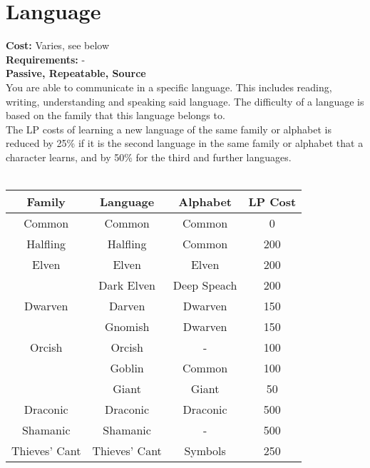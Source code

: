 \section{Language}\label{sec:language}
\textbf{Cost:} Varies, see below\\
\textbf{Requirements:} -\\
\textbf{Passive, Repeatable, Source}\\
You are able to communicate in a specific language.
This includes reading, writing, understanding and speaking said language.
The difficulty of a language is based on the family that this language belongs to.\\
The LP costs of learning a new language of the same family or alphabet is reduced by 25\% if it is the second language in the same family or alphabet that a character learns, and by 50\% for the third and further languages.\\
\\

\begin{minipage}{0.25\textwidth}
    \begin{tabular}{ c | c | c | c }
        Family & Language & Alphabet & LP Cost \\
        \hline
        Common & Common & Common & 0  \\
        \hline
        Halfling & Halfling & Common & 200 \\
        \hline
        Elven & Elven & Elven & 200 \\
        & Dark Elven & Deep Speach & 200 \\
        \hline
        Dwarven & Darven & Dwarven & 150 \\
        & Gnomish & Dwarven & 150 \\
        \hline
        Orcish & Orcish & - & 100 \\
        & Goblin & Common & 100 \\
        & Giant & Giant & 50 \\
        \hline
        Draconic & Draconic & Draconic & 500 \\
        \hline
        Shamanic & Shamanic & - & 500 \\
        \hline
        Thieves' Cant & Thieves' Cant & Symbols & 250 \\
    \end{tabular}
\end{minipage}
